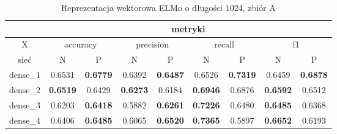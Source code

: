 \begin{table}[p]  \centering
    \caption{Reprezentacja wektorowa ELMo o długości 1024, zbiór A}
    \label{tab:wyniki_elmo_A}
    \begin{tabular}{|c|c|c|c|c|c|c|c|c|}    \hline
                 & \multicolumn{8}{c|}{metryki}                                                                                                                                                                                                                                                                                  \\ \hline
        X        & \multicolumn{2}{c|}{accuracy}       & \multicolumn{2}{c|}{precision}      & \multicolumn{2}{c|}{recall}         & \multicolumn{2}{c|}{f1}                                                                                                                                                                     \\ \hline
        sieć     & N                                   & P                                   & N                                   & P                                   & N                                   & P                                   & N                                   & P                                   \\ \hline
        dense\_1 & 0.6531                              & \textbf{0.6779}                     & 0.6392                              & \textbf{0.6487}                     & 0.6526                              & \textbf{0.7319}                     & 0.6459                              & \textbf{0.6878}                     \\ \hline
        dense\_2 & \textbf{0.6519}                     & 0.6429                              & \textbf{0.6273}                     & 0.6184                              & \textbf{0.6946}                     & 0.6876                              & \textbf{0.6592}                     & 0.6512                              \\ \hline
        dense\_3 & 0.6203                              & \textbf{0.6418}                     & 0.5882                              & \textbf{0.6261}                     & \textbf{0.7226}                     & 0.6480                              & \textbf{0.6485}                     & 0.6368                              \\ \hline
        dense\_4 & 0.6406                              & \textbf{0.6485}                     & 0.6065                              & \textbf{0.6520}                     & \textbf{0.7365}                     & 0.5897                              & \textbf{0.6652}                     & 0.6193                              \\ \hline

\end{tabular}
\end{table}
